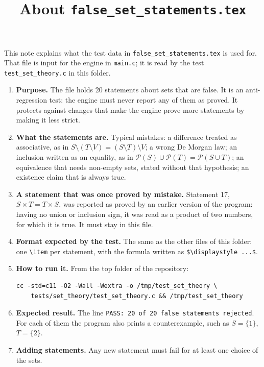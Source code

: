 \documentclass[11pt,a4paper]{article}
\title{About \texttt{false\_set\_statements.tex}}
\author{}
\date{}
\begin{document}
\maketitle
This note explains what the test data in \texttt{false\_set\_statements.tex} is used for. That file is input for the engine in \texttt{main.c}; it is read by the test \texttt{test\_set\_theory.c} in this folder.

\begin{enumerate}
\item \textbf{Purpose.} The file holds 20 statements about sets that are false. It is an anti-regression test: the engine must never report any of them as proved. It protects against changes that make the engine prove more statements by making it less strict.

\item \textbf{What the statements are.} Typical mistakes: a difference treated as associative, as in $S \setminus (T \setminus V) = (S \setminus T) \setminus V$; a wrong De Morgan law; an inclusion written as an equality, as in $\mathcal{P}(S) \cup \mathcal{P}(T) = \mathcal{P}(S \cup T)$; an equivalence that needs non-empty sets, stated without that hypothesis; an existence claim that is always true.

\item \textbf{A statement that was once proved by mistake.} Statement 17, $S \times T = T \times S$, was reported as proved by an earlier version of the program: having no union or inclusion sign, it was read as a product of two numbers, for which it is true. It must stay in this file.

\item \textbf{Format expected by the test.} The same as the other files of this folder: one \texttt{\textbackslash item} per statement, with the formula written as \texttt{\$\textbackslash displaystyle ...\$}.

\item \textbf{How to run it.} From the top folder of the repository:
\begin{verbatim}
cc -std=c11 -O2 -Wall -Wextra -o /tmp/test_set_theory \
    tests/set_theory/test_set_theory.c && /tmp/test_set_theory
\end{verbatim}

\item \textbf{Expected result.} The line \texttt{PASS: 20 of 20 false statements rejected}. For each of them the program also prints a counterexample, such as $S = \{1\}$, $T = \{2\}$.

\item \textbf{Adding statements.} Any new statement must fail for at least one choice of the sets.
\end{enumerate}
\end{document}
